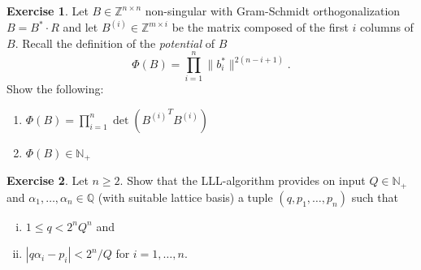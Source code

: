 \documentclass[12pt,a4paper]{article}
\theoremstyle{plain}
\newtheorem*{Sol*}{Solution}
\theoremstyle{definition}
\newtheorem{Ex}{Exercise}
\newif\ifsolutions
\newcommand{\exercise}[2]{
			\begin{Ex} #1 \end{Ex}
			\ifsolutions  \begin{Sol*} #2 \end{Sol*} \bigskip \else \bigskip  \fi
		}
\begin{document}
  \exercise{
    Let $B ∈ℤ^{n×n}$ non-singular with Gram-Schmidt orthogonalization $B = B^*⋅ R$ and let $B^{(i)} ∈ℤ^{m ×i}$ be the matrix composed of the first $i$ columns of $B$.  Recall the definition of the \emph{potential} of $B$
    \begin{displaymath}
      Φ(B) = ∏_{i=1}^n \|b_i^*\|^{2(n-i+1)}.
    \end{displaymath}
    Show the following:
    \begin{enumerate}
    \item $ Φ(B) = ∏_{i=1}^n \det\left({B^{(i)}}^T B^{(i)}\right)$
    \item $ Φ(B) ∈ ℕ_+$  
    \end{enumerate}
  }{}


  \exercise{Let $n≥2$. 
    Show that the LLL-algorithm provides on input $Q ∈ℕ_+$ and $α_1,\dots,α_n ∈ℚ$ (with suitable lattice basis)  a tuple $(q,p_1,\dots,p_n)$ such that
      \begin{enumerate}[i)] 
      \item $1 ≤ q < 2^n Q^n$ and
      \item $| q α_i - p_i | < 2^n/Q$ for $i=1,\dots,n$. 
      \end{enumerate}

    }{}
  
\end{document}

